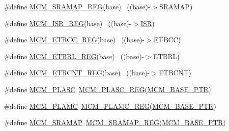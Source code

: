 \begin{DoxyCompactItemize}
\#define \hyperlink{group___m_c_m___register___accessor___macros_gaa9b5f68219c6999f065f771723a23c40}{M\+C\+M\+\_\+\+S\+R\+A\+M\+A\+P\+\_\+\+R\+EG}(base)                                      ~((base)-\/$>$S\+R\+A\+M\+AP)
\item 
\#define \hyperlink{group___m_c_m___register___accessor___macros_ga7b1bf4ac9973931126074ef241b54d40}{M\+C\+M\+\_\+\+I\+S\+R\+\_\+\+R\+EG}(base)                                            ~((base)-\/$>$\hyperlink{z1_2board_8c_abd2ea147e2f49c556aed52a142c74998}{I\+SR})
\item 
\#define \hyperlink{group___m_c_m___register___accessor___macros_gab88a04ecfdb01a192fb627f315a66abb}{M\+C\+M\+\_\+\+E\+T\+B\+C\+C\+\_\+\+R\+EG}(base)                                        ~((base)-\/$>$E\+T\+B\+CC)
\item 
\#define \hyperlink{group___m_c_m___register___accessor___macros_gab144bfdec0d6f7c4d122fa43df862204}{M\+C\+M\+\_\+\+E\+T\+B\+R\+L\+\_\+\+R\+EG}(base)                                        ~((base)-\/$>$E\+T\+B\+RL)
\item 
\#define \hyperlink{group___m_c_m___register___accessor___macros_gab85d93512507faf0c706eba59d5533db}{M\+C\+M\+\_\+\+E\+T\+B\+C\+N\+T\+\_\+\+R\+EG}(base)                                      ~((base)-\/$>$E\+T\+B\+C\+NT)
\item 
\#define \hyperlink{group___m_c_m___register___accessor___macros_ga1741cb7cdef46052c2ac9e7d28fb2b53}{M\+C\+M\+\_\+\+P\+L\+A\+SC}~\hyperlink{group___m_c_m___register___accessor___macros_gad331cc7eeaf62bb3d0fc388993df2a8f}{M\+C\+M\+\_\+\+P\+L\+A\+S\+C\+\_\+\+R\+EG}(\hyperlink{group___m_c_m___peripheral_gad41e931f176c230831e3dbad45117841}{M\+C\+M\+\_\+\+B\+A\+S\+E\+\_\+\+P\+TR})
\item 
\#define \hyperlink{group___m_c_m___register___accessor___macros_ga63f36c9c5700eb5fca4fe3852e1d6dfd}{M\+C\+M\+\_\+\+P\+L\+A\+MC}~\hyperlink{group___m_c_m___register___accessor___macros_ga56804c4b9f516c18d994d033cae1dc30}{M\+C\+M\+\_\+\+P\+L\+A\+M\+C\+\_\+\+R\+EG}(\hyperlink{group___m_c_m___peripheral_gad41e931f176c230831e3dbad45117841}{M\+C\+M\+\_\+\+B\+A\+S\+E\+\_\+\+P\+TR})
\item 
\#define \hyperlink{group___m_c_m___register___accessor___macros_ga68e7c75538d9413fa9ceabc1a8da924a}{M\+C\+M\+\_\+\+S\+R\+A\+M\+AP}~\hyperlink{group___m_c_m___register___accessor___macros_gaa9b5f68219c6999f065f771723a23c40}{M\+C\+M\+\_\+\+S\+R\+A\+M\+A\+P\+\_\+\+R\+EG}(\hyperlink{group___m_c_m___peripheral_gad41e931f176c230831e3dbad45117841}{M\+C\+M\+\_\+\+B\+A\+S\+E\+\_\+\+P\+TR})

\end{DoxyCompactItemize}

